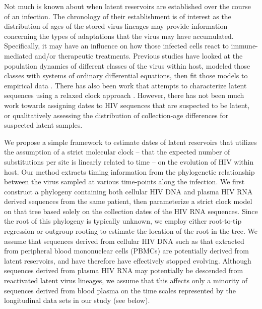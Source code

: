 Not much is known about when latent reservoirs are established over the course of an infection. 
The chronology of their establishment is of interest as the distribution of ages of the stored virus lineages may provide information concerning the types of adaptations that the virus may have accumulated. 
Specifically, it may have an influence on how those infected cells react to immune-mediated and/or therapeutic treatments. 
Previous studies have looked at the population dynamics of different classes of the virus within host, modeled those classes with systems of ordinary differential equations, then fit those models to empirical data \citep{Althaus14}. 
There has also been work that attempts to characterize latent sequences using a relaxed clock approach \citep{Immonen14}. 
However, there has not been much work towards assigning dates to HIV sequences that are suspected to be latent, or qualitatively assessing the distribution of collection-age differences for suspected latent samples.

We propose a simple framework to estimate dates of latent reservoirs that utilizes the assumption of a strict molecular clock -- that the expected number of substitutions per site is linearly related to time \citep{Ho14} --  on the evolution of HIV within host. 
Our method extracts timing information from the phylogenetic relationship between the virus sampled at various time-points along the infection. 
We first construct a phylogeny containing both cellular HIV DNA and plasma HIV RNA derived sequences from the same patient, then parameterize a strict clock model on that tree based solely on the collection dates of the HIV RNA sequences. 
Since the root of this phylogeny is typically unknown, we employ either root-to-tip regression \citep{Korber00} or outgroup rooting to estimate the location of the root in the tree. 
We assume that sequences derived from cellular HIV DNA such as that extracted from peripheral blood mononuclear cells (PBMCs) are potentially derived from latent reservoirs, and have therefore have effectively stopped evolving.
Although sequences derived from plasma HIV RNA may potentially be descended from reactivated latent virus lineages, we assume that this affects only a minority of sequences derived from blood plasma on the time scales represented by the longitudinal data sets in our study (see below).

